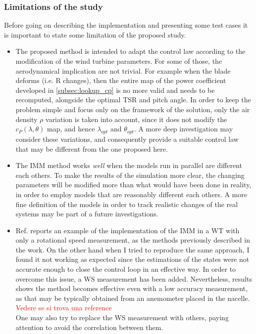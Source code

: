 \subsubsection{Limitations of the study}
Before going on describing the implementation and presenting some test cases it is important to state some limitation of the proposed study.
\begin{itemize}
  \item The proposed method is intended to adapt the control law according to the modification of the wind turbine parameters. For some of those, the aerodynamical implication are not trivial. For example when the blade deforms (i.e. R changes), then the entire map of the power coefficient developed in \autoref{subsec:lookup_cp} is no more valid and needs to be recomputed, alongside the optimal TSR and pitch angle. In order to keep the problem simple and focus only on the framework of the solution, only the air density $\rho$ variation is taken into account, since it does not modify the $c_P(\lambda,\theta)$ map, and hence $\lambda_{opt}$ and $\theta_{opt}$. A more deep investigation may consider these variations, and consequently provide a suitable control law that may be different from the one proposed here. 
  \item The IMM method works \textit{well} when the models run in parallel are different each others. To make the results of the simulation more clear, the changing parameters will be modified more than what would have been done in reality, in order to employ models that are reasonably different each others. A more fine definition of the models in order to track realistic changes of the real systems may be part of a future investigations. 
  \item Ref. \cite{kalman_based_IMM} reports an example of the implementation of the IMM in a WT with only a rotational speed measurement, as the methods previously described in the work. On the other hand when I tried to reproduce the same approach, I found it not working as expected since the estimations of the states were not accurate enough to close the control loop in an effective way. In order to overcome this issue, a WS measurement has been added. Nevertheless, results shows the method becomes effective even with a low accuracy measurement, as that may be typically obtained from an anemometer placed in the nacelle. \textcolor{red}{Vedere se si trova una reference} \\
  One may also try to replace the WS measurement with others, paying attention to avoid the correlation between them.
\end{itemize} 


